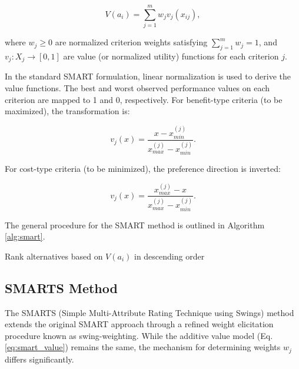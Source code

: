 \documentclass[conference]{IEEEtran}
\begin{document}
\begin{equation}
	V(a_i) = \sum_{j=1}^{m} w_j v_j(x_{ij}),
	\label{eq:smart_value}
\end{equation}

\noindent where $w_j \geq 0$ are normalized criterion weights satisfying $\sum_{j=1}^{m} w_j = 1$, and $v_j: X_j \rightarrow [0, 1]$ are value (or normalized utility) functions for each criterion $j$. 

In the standard SMART formulation, linear normalization is used to derive the value functions. The best and worst observed performance values on each criterion are mapped to 1 and 0, respectively. For benefit-type criteria (to be maximized), the transformation is:

\begin{equation}
	v_j(x) = \frac{x - x_{min}^{(j)}}{x_{max}^{(j)} - x_{min}^{(j)}}.
	\label{eq:smart_benefit}
\end{equation}

\noindent For cost-type criteria (to be minimized), the preference direction is inverted:

\begin{equation}
	v_j(x) = \frac{x_{max}^{(j)} - x}{x_{max}^{(j)} - x_{min}^{(j)}}.
	\label{eq:smart_cost}
\end{equation}

\noindent The general procedure for the SMART method is outlined in Algorithm \ref{alg:smart}.

\begin{algorithm}
	\caption{SMART Evaluation Procedure}
	\label{alg:smart}
	\SetAlgoLined
	Rank alternatives based on $V(a_i)$ in descending order\;
\end{algorithm}

\subsection{SMARTS Method}
The SMARTS (Simple Multi-Attribute Rating Technique using Swings) method extends the original SMART approach through a refined weight elicitation procedure known as swing-weighting. While the additive value model (Eq. \ref{eq:smart_value}) remains the same, the mechanism for determining weights $w_j$ differs significantly.
\end{document}

